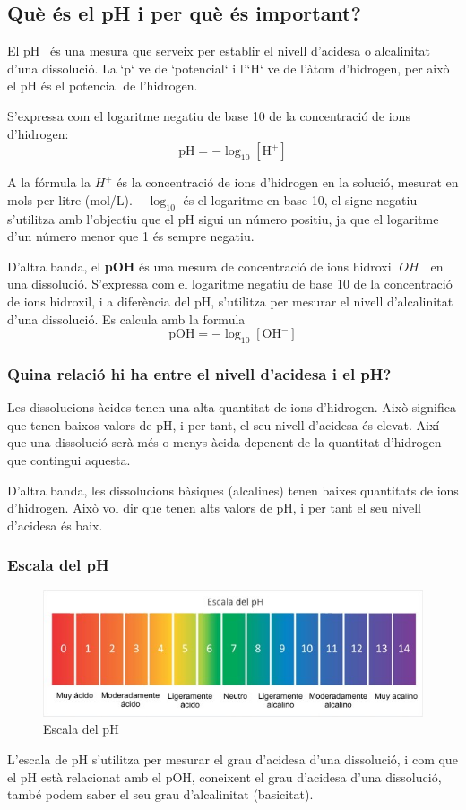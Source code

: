 \subsection{Què és el pH i per què és important?}
El pH~\cite{PH} és una mesura que serveix per establir el nivell d’acidesa o alcalinitat d'una dissolució. La `p` ve de `potencial` i l'`H` ve de l’àtom d’hidrogen, per això el pH és el potencial de l’hidrogen.
%

S'expressa com el logaritme negatiu de base 10 de la concentració de ions d'hidrogen: $$ \text{pH} = -\log_{10} [\mathrm{H}^+] $$

A la fórmula la ${H}^+$ és la concentració de ions d'hidrogen en la solució, mesurat en mols per litre (mol/L). $-\log_{10}$ és el logaritme en base 10, el signe negatiu s'utilitza amb l'objectiu que el pH sigui un número positiu, ja que el logaritme d'un número menor que 1 és sempre negatiu.

D'altra banda, el \textbf{pOH} és una mesura de concentració de ions hidroxil ${OH}^-$ en una dissolució. S'expressa com el logaritme negatiu de base 10 de la concentració de ions hidroxil, i a diferència del pH, s'utilitza per mesurar el nivell d’alcalinitat d'una dissolució. Es calcula amb la formula  $$ \text{pOH} = -\log_{10} [\mathrm{OH}^-] $$

\subsubsection{ Quina relació hi ha entre el nivell d'acidesa i el pH?}
Les dissolucions àcides tenen una alta quantitat de ions d'hidrogen. Això significa que tenen baixos valors de pH, i per tant, el seu nivell d'acidesa és elevat. Així que una dissolució serà més o menys àcida depenent de la quantitat d'hidrogen que contingui aquesta.


D'altra banda, les dissolucions bàsiques (alcalines) tenen baixes quantitats de ions d'hidrogen. Això vol dir que tenen alts valors de pH, i per tant el seu nivell d'acidesa és baix.
\subsubsection{Escala del pH}
\begin{figure}[h!]
\centering
\includegraphics[width=1\textwidth]{./Figures/EscaladepH.png}
\caption{Escala del pH}
\label{fig:escaladeph}
\end{figure}
L'escala de pH s'utilitza per mesurar el grau d'acidesa d'una dissolució, i com que el pH està relacionat amb el pOH, coneixent el grau d'acidesa d'una dissolució, també podem saber el seu grau d'alcalinitat (basicitat).%

